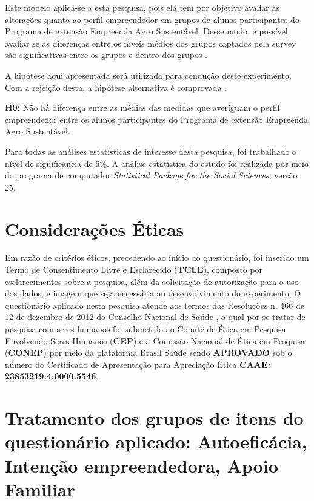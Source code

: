 Este modelo aplica-se a esta pesquisa, pois ela tem por objetivo avaliar as alterações quanto ao perfil empreendedor em grupos de alunos participantes do Programa de extensão Empreenda Agro Sustentável. Desse modo, é possível avaliar se as diferenças entre os níveis médios dos grupos captados pela \textit{}{survey} são significativas entre os grupos e dentro dos grupos \cite{rocha_avaliacao_2014}. 

A hipótese aqui apresentada será utilizada para condução deste experimento. Com a rejeição desta, a hipótese alternativa é comprovada \cite{hair_alise_2009}.

\textbf{H0:} Não há diferença entre as médias das medidas que averíguam o perfil empreendedor entre os alunos participantes do Programa de extensão Empreenda Agro Sustentável.


Para todas as análises estatísticas de interesse desta pesquisa, foi trabalhado o nível de significância de 5\%. A análise estatística do estudo foi realizada por meio do programa de computador \textit{Statistical Package for the Social Sciences}, \cite{ibm_corp_ibm_2017} versão 25. 


\section{Considerações Éticas}

Em razão de critérios éticos, precedendo ao início do questionário, foi inserido um Termo de Consentimento Livre e Esclarecido (\textbf{TCLE}), composto por esclarecimentos sobre a pesquisa, além da solicitação de autorização para o uso dos dados, e imagem que seja necessária ao desenvolvimento do experimento. O questionário aplicado nesta pesquisa atende aos termos das Resoluções n. 466 de 12 de dezembro de 2012 do Conselho Nacional de Saúde \cite{cns_resolucao_2012}, o qual por se tratar de pesquisa com seres humanos foi submetido ao Comitê de Ética em Pesquisa Envolvendo Seres Humanos (\textbf{CEP}) e a Comissão Nacional de Ética em Pesquisa (\textbf{CONEP}) por meio da plataforma Brasil Saúde sendo \textbf{APROVADO} sob o número do Certificado de Apresentação para Apreciação Ética \textbf{CAAE: 23853219.4.0000.5546}.


\section{Tratamento dos grupos de itens do questionário aplicado: Autoeficácia, Intenção empreendedora, Apoio Familiar}

